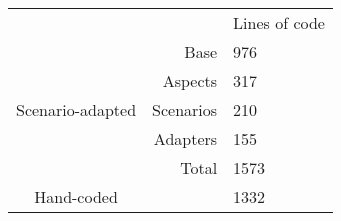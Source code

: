 
\begin{tabular}{crl}
\toprule
&    & \multicolumn{1}{c}{Lines of code} \\
\cmidrule{3-3}
\multirow{5}{*}{Scenario-adapted} & Base & 976   \\
& Aspects &  317 \\
& Scenarios & 210  \\
& Adapters & 155  \\
& Total &  1573  \\
\midrule
Hand-coded &   &  1332     \\
\bottomrule
\end{tabular}

